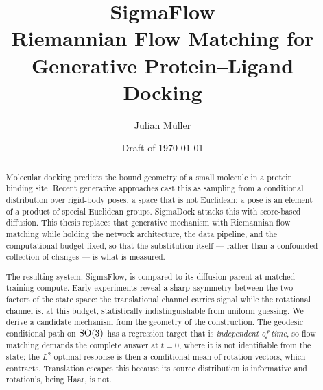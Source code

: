 \documentclass[11pt,a4paper]{report}
\title{\textbf{SigmaFlow}\\[0.3em]
       \large Riemannian Flow Matching for Generative Protein--Ligand Docking}
\author{Julian M\"uller}
\date{Draft of \today}
\begin{document}
\maketitle

\begin{abstract}
\noindent
Molecular docking predicts the bound geometry of a small molecule in a protein
binding site. Recent generative approaches cast this as sampling from a
conditional distribution over rigid-body poses, a space that is not Euclidean:
a pose is an element of a product of special Euclidean groups. SigmaDock
attacks this with score-based diffusion. This thesis replaces that generative
mechanism with Riemannian flow matching while holding the network
architecture, the data pipeline, and the computational budget fixed, so that
the substitution itself --- rather than a confounded collection of changes ---
is what is measured.

The resulting system, SigmaFlow, is compared to its diffusion parent at
matched training compute. Early experiments reveal a sharp asymmetry between
the two factors of the state space: the translational channel carries signal
while the rotational channel is, at this budget, statistically
indistinguishable from uniform guessing. We derive a candidate mechanism from
the geometry of the construction. The geodesic conditional path on
$\mathrm{SO}(3)$ has a regression target that is \emph{independent of time}, so flow
matching demands the complete answer at $t=0$, where it is not identifiable
from the state; the $L^2$-optimal response is then a conditional mean of
rotation vectors, which contracts. Translation escapes this because its source
distribution is informative and rotation's, being Haar, is not.

\end{abstract}


\tableofcontents














\appendix

\end{document}
